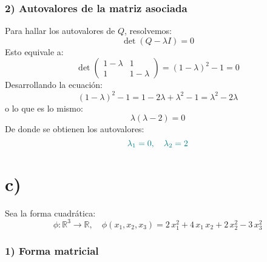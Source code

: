\documentclass{article}
\begin{document}
\subsubsection*{2) Autovalores de la matriz asociada}

Para hallar los autovalores de \(Q\), resolvemos:
\[
\det(Q - \lambda I) = 0
\]
Esto equivale a:
\[
\det\begin{pmatrix}
1-\lambda & 1\\
1 & 1-\lambda
\end{pmatrix}
= (1-\lambda)^2 - 1 = 0
\]
Desarrollando la ecuación:
\[
(1-\lambda)^2 - 1 = 1 - 2\lambda + \lambda^2 - 1 = \lambda^2 - 2\lambda
\]
o lo que es lo mismo:
\[
\lambda(\lambda - 2) = 0
\]
De donde se obtienen los autovalores:
\[
\color{teal}
\lambda_1 = 0,
\quad
\lambda_2 = 2
\]

\section*{c)}

Sea la forma cuadrática:
\[
\phi:\mathbb{R}^3 \to \mathbb{R},
\quad
\phi(x_1,x_2,x_3) = 2\,x_1^2 + 4\,x_1\,x_2 + 2\,x_2^2 - 3\,x_3^2
\]

\subsubsection*{1) Forma matricial}
\end{document}
